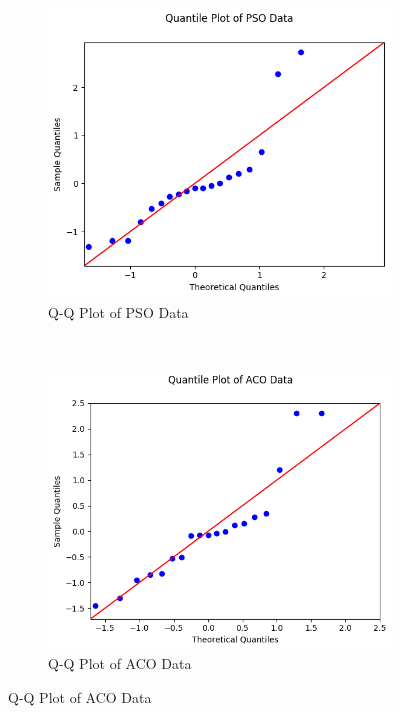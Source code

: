 \documentclass{report}
\begin{document}
\begin{figure}[H]
	\begin{subfigure}[h]{0.4\textwidth}
		\centering
		\includegraphics[width=\textwidth]{images/pso_qq}
		\caption{Q-Q Plot of PSO Data}
		\label{fig:qqpso}
	\end{subfigure}
	~
	\begin{subfigure}[h]{0.4\textwidth}
		\centering
		\includegraphics[width=\textwidth]{images/aco_qq}
		\caption{Q-Q Plot of ACO Data}
		\label{fig:qqaco}
	\end{subfigure}

\end{figure}
\end{document}
